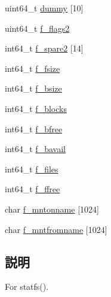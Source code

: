 \begin{DoxyCompactItemize}
\item 
uint64\_\-t \hyperlink{structTru64_1_1F64__statfs_a4cd74d7de5e89a80fa201325cf18b8fd}{dummy} \mbox{[}10\mbox{]}
\item 
uint64\_\-t \hyperlink{structTru64_1_1F64__statfs_a7d4584d268a0b90e4d48b55fcb7df4d5}{f\_\-flags2}
\item 
int64\_\-t \hyperlink{structTru64_1_1F64__statfs_a87d442af5cc940ec998224826a9230bd}{f\_\-spare2} \mbox{[}14\mbox{]}
\item 
int64\_\-t \hyperlink{structTru64_1_1F64__statfs_a2d16e9093f068b79e8b3672e6bf6e0cf}{f\_\-fsize}
\item 
int64\_\-t \hyperlink{structTru64_1_1F64__statfs_a0d893c69ad2c6fcf7def020a81a7cdd9}{f\_\-bsize}
\item 
int64\_\-t \hyperlink{structTru64_1_1F64__statfs_a68137154ae95f06f2317ee1d6c23d49e}{f\_\-blocks}
\item 
int64\_\-t \hyperlink{structTru64_1_1F64__statfs_a4d8b842cc5ca569ce4086215e29d4c36}{f\_\-bfree}
\item 
int64\_\-t \hyperlink{structTru64_1_1F64__statfs_abfb75516855e6fbfb151874c033872c7}{f\_\-bavail}
\item 
int64\_\-t \hyperlink{structTru64_1_1F64__statfs_a016818ad29d835fe0a6a3bca3f477ca6}{f\_\-files}
\item 
int64\_\-t \hyperlink{structTru64_1_1F64__statfs_a9b367124beed32a52ece9401c8182f47}{f\_\-ffree}
\item 
char \hyperlink{structTru64_1_1F64__statfs_a999c2258bfd97680947883a5a21b1276}{f\_\-mntonname} \mbox{[}1024\mbox{]}
\item 
char \hyperlink{structTru64_1_1F64__statfs_a33c4d293d3c9920d2d14cfb4665a42c4}{f\_\-mntfromname} \mbox{[}1024\mbox{]}
\end{DoxyCompactItemize}


\subsection{説明}
For statfs(). 


